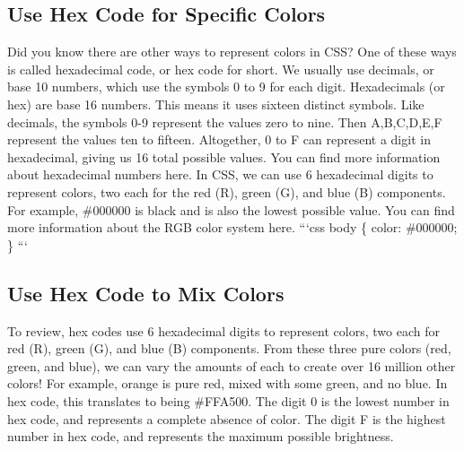 \documentclass{article}%
\begin{document}
%
\subsection{Use Hex Code for Specific Colors}%
\label{subsec:UseHexCodeforSpecificColors}%
Did you know there are other ways to represent colors in CSS? One of these ways is called hexadecimal code, or hex code for short.\newline%
We usually use decimals, or base 10 numbers, which use the symbols 0 to 9 for each digit. Hexadecimals (or hex) are base 16 numbers. This means it uses sixteen distinct symbols. Like decimals, the symbols 0{-}9 represent the values zero to nine. Then A,B,C,D,E,F represent the values ten to fifteen. Altogether, 0 to F can represent a digit in hexadecimal, giving us 16 total possible values. You can find more information about hexadecimal numbers here.\newline%
In CSS, we can use 6 hexadecimal digits to represent colors, two each for the red (R), green (G), and blue (B) components. For example, \#000000 is black and is also the lowest possible value. You can find more information about the RGB color system here.\newline%
```css\newline%
body \{\newline%
  color: \#000000;\newline%
\}\newline%
```\newline%

%
\subsection{Use Hex Code to Mix Colors}%
\label{subsec:UseHexCodetoMixColors}%
To review, hex codes use 6 hexadecimal digits to represent colors, two each for red (R), green (G), and blue (B) components.\newline%
From these three pure colors (red, green, and blue), we can vary the amounts of each to create over 16 million other colors!\newline%
For example, orange is pure red, mixed with some green, and no blue. In hex code, this translates to being \#FFA500.\newline%
The digit 0 is the lowest number in hex code, and represents a complete absence of color.\newline%
The digit F is the highest number in hex code, and represents the maximum possible brightness.\newline%
\end{document}
